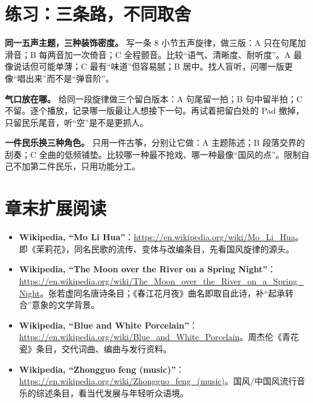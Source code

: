\section{练习：三条路，不同取舍}
\label{sec:guofeng-practice}

\begin{exercise}
\textbf{同一五声主题，三种装饰密度。} 写一条 8 小节五声旋律，做三版：A 只在句尾加滑音；B 每两音加一次倚音；C 全程颤音。比较“语气、清晰度、耐听度”。A 最像说话但可能单薄；C 最有“味道”但容易腻；B 居中。找人盲听，问哪一版更像“唱出来”而不是“弹音阶”。
\end{exercise}

\begin{exercise}
\textbf{气口放在哪。} 给同一段旋律做三个留白版本：A 句尾留一拍；B 句中留半拍；C 不留。逐个播放，记录哪一版最让人想接下一句。再试着把留白处的 Pad 撤掉，只留民乐尾音，听“空”是不是更抓人。
\end{exercise}

\begin{exercise}
\textbf{一件民乐换三种角色。} 只用一件古筝，分别让它做：A 主题陈述；B 段落交界的刮奏；C 全曲的低频铺垫。比较哪一种最不抢戏、哪一种最像“国风的点”。限制自己不加第二件民乐，只用功能分工。
\end{exercise}

\section{章末扩展阅读}
\label{sec:guofeng-reading}

\begin{sloppypar}
\begin{itemize}
\item \textbf{Wikipedia, “Mo Li Hua”}：\url{https://en.wikipedia.org/wiki/Mo_Li_Hua}。即《茉莉花》，同名民歌的流传、变体与改编条目，先看国风旋律的源头。
\item \textbf{Wikipedia, “The Moon over the River on a Spring Night”}：\url{https://en.wikipedia.org/wiki/The_Moon_over_the_River_on_a_Spring_Night}。张若虚同名唐诗条目；《春江花月夜》曲名即取自此诗，补“起承转合”意象的文学背景。
\item \textbf{Wikipedia, “Blue and White Porcelain”}：\url{https://en.wikipedia.org/wiki/Blue_and_White_Porcelain}。周杰伦《青花瓷》条目，交代词曲、编曲与发行资料。
\item \textbf{Wikipedia, “Zhongguo feng (music)”}：\url{https://en.wikipedia.org/wiki/Zhongguo_feng_(music)}。国风/中国风流行音乐的综述条目，看当代发展与年轻听众语境。
\end{itemize}
\end{sloppypar}

